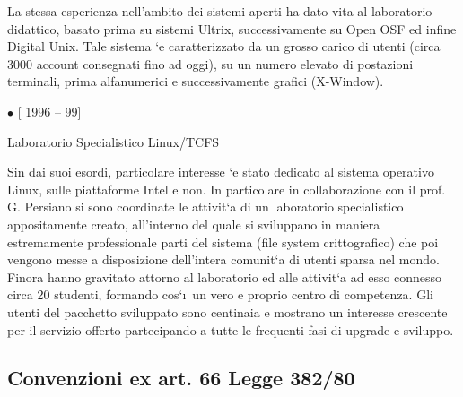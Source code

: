 \documentclass[11pt]{article}
\newlength{\posii}
\newlength{\posiibox}
\newlength{\boxsize}
\begin{document}
\begin{description}
{La stessa esperienza nell'ambito dei sistemi aperti ha dato vita al
laboratorio didattico, basato prima su sistemi Ultrix, successivamente
su Open OSF ed infine Digital Unix. Tale sistema \a`e caratterizzato
da un grosso carico di utenti (circa 3000 account consegnati fino ad
oggi), su un numero elevato di postazioni terminali, prima
alfanumerici e successivamente grafici (X-Window).
}


\item \parbox[t]{\posiibox} 
{\bf \raggedright $ \bullet $ [ 1996 -- 99] \par
\medskip
Laboratorio Specialistico Linux/TCFS}
\hfill \parbox[t]{\boxsize} {

Sin dai suoi esordi, particolare interesse \a`e stato dedicato al
sistema operativo Linux, sulle piattaforme Intel e non. In particolare
in collaborazione con il prof. G. Persiano si sono coordinate le
attivit\a`a di un laboratorio specialistico appositamente creato,
all'interno del quale si sviluppano in maniera estremamente
professionale parti del sistema (file system crittografico) che poi
vengono messe a disposizione dell'intera comunit\a`a di utenti sparsa
nel mondo. Finora hanno gravitato attorno al laboratorio ed alle
attivit\a`a ad esso connesso circa 20 studenti, formando cos\a`\i\ un
vero e proprio centro di competenza. Gli utenti del pacchetto
sviluppato sono centinaia e mostrano un interesse crescente per il
servizio offerto partecipando a tutte le frequenti fasi di upgrade e
sviluppo.}


\end{description}

\subsection{Convenzioni ex art. 66 Legge 382/80}
\end{document}
